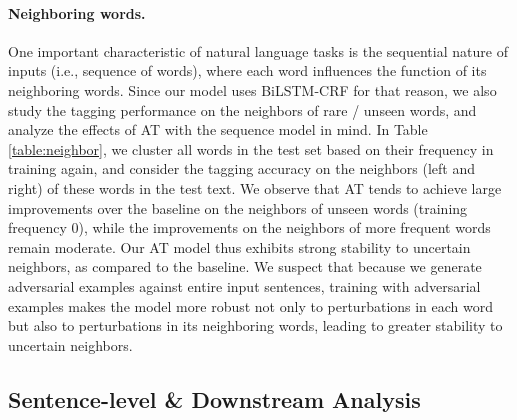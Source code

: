 \documentclass[11pt,a4paper]{article}
\begin{document}
\paragraph{Neighboring words.}

One important characteristic of natural language tasks is the sequential nature of inputs (i.e., sequence of words), where each word influences the function of its neighboring words.
Since our model uses BiLSTM-CRF for that reason, we also study the tagging performance on the neighbors of rare \!/\! unseen words, and analyze the effects of AT with the sequence model in mind.
In Table \ref{table:neighbor},
we cluster all words in the test set based on their frequency in training again, and consider the tagging accuracy on the neighbors (left and right) of these words in the test text.
We observe that AT tends to achieve large improvements over the baseline on the neighbors of unseen words (training frequency 0),
while the improvements on the neighbors of more frequent words remain moderate.
Our AT model thus exhibits strong stability to uncertain neighbors, as compared to the baseline.
We suspect that because
we generate adversarial examples against entire input sentences,
training with adversarial examples makes the model more robust not only to perturbations in each word but also to perturbations in its neighboring words, 
leading to greater stability to uncertain neighbors.





\subsection{Sentence-level \& Downstream Analysis}
\label{Sentence-level_Analysis}
\end{document}
